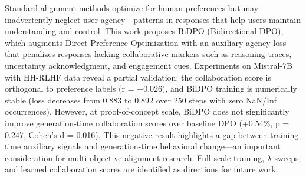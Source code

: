 
Standard alignment methods optimize for human preferences but may inadvertently neglect user agency---patterns in responses that help users maintain understanding and control. This work proposes BiDPO (Bidirectional DPO), which augments Direct Preference Optimization with an auxiliary agency loss that penalizes responses lacking collaborative markers such as reasoning traces, uncertainty acknowledgment, and engagement cues. Experiments on Mistral-7B with HH-RLHF data reveal a partial validation: the collaboration score is orthogonal to preference labels (r = $-0.026)$, and BiDPO training is numerically stable (loss decreases from 0.883 to 0.892 over 250 steps with zero NaN/Inf occurrences). However, at proof-of-concept scale, BiDPO does not significantly improve generation-time collaboration scores over baseline DPO (+0.54\%, p = 0.247, Cohen's d = 0.016). This negative result highlights a gap between training-time auxiliary signals and generation-time behavioral change---an important consideration for multi-objective alignment research. Full-scale training, $\lambda$ sweeps, and learned collaboration scores are identified as directions for future work.

